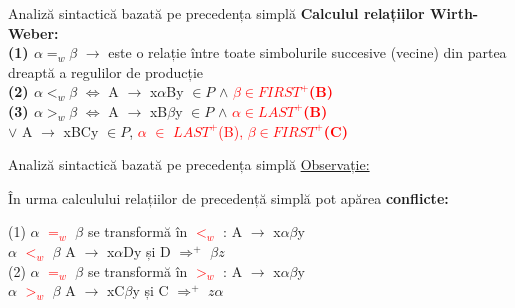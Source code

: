 \documentclass[pdf]{beamer}
\begin{document}
\begin{frame}{Analiză sintactică bazată pe precedența simplă}
\textbf{Calculul relațiilor Wirth-Weber:}\\

\textcolor{ballblue}{\textbf{(1) $\alpha =_{w}\beta$}} $\rightarrow$ este o relație între toate simbolurile succesive (vecine) din partea dreaptă a regulilor de producție\\

\textcolor{ballblue}{\textbf{(2) $\alpha <_{w}\beta$}} $\iff$ A $\rightarrow$ x$\alpha$By $\in P$ $\land$ \textcolor{red}{\textbf{$\beta \in FIRST^+$(B)}}\\

\textcolor{ballblue}{\textbf{(3) $\alpha >_{w}\beta$}} $\iff$  A $\rightarrow$ xB$\beta$y $\in P$ $\land$ \textcolor{red}{\textbf{$\alpha \in LAST^+$(B)}}\\

$\lor$ A $\rightarrow$ xBCy $\in P$, \textcolor{red}{$\alpha$ $\in$ $LAST^+$(B),} \textcolor{red}{\textbf{$\beta \in FIRST^+$(C)}}\\
\end{frame}



\begin{frame}{Analiză sintactică bazată pe precedența simplă}
\textcolor{ballblue}{\underline{Observație:}}\\
\begin{center}
În urma calculului relațiilor de precedență simplă pot apărea \textcolor{ballblue}{\textbf{conflicte:}}\\
\end{center}

(1) $\alpha$ \textcolor{red}{$=_{w}$} $\beta$ se transformă în \textcolor{red}{$<_{w}$} : A $\rightarrow$ x$\alpha \beta$y\\
 \hspace{0.5cm} $\alpha$ \textcolor{red}{$<_{w}$} $\beta$   \hspace{3.5cm} A $\rightarrow$ x$\alpha$Dy și D $\Rightarrow^+$ $\beta z$\\
 
(2) $\alpha$ \textcolor{red}{$=_{w}$} $\beta$ se transformă în \textcolor{red}{$>_{w}$} : A $\rightarrow$ x$\alpha \beta$y\\
 \hspace{0.5cm} $\alpha$ \textcolor{red}{$>_{w}$} $\beta$   \hspace{3.5cm} A $\rightarrow$ xC$\beta$y și C $\Rightarrow^+$ $z \alpha$\\
 
\end{frame}
\end{document}
